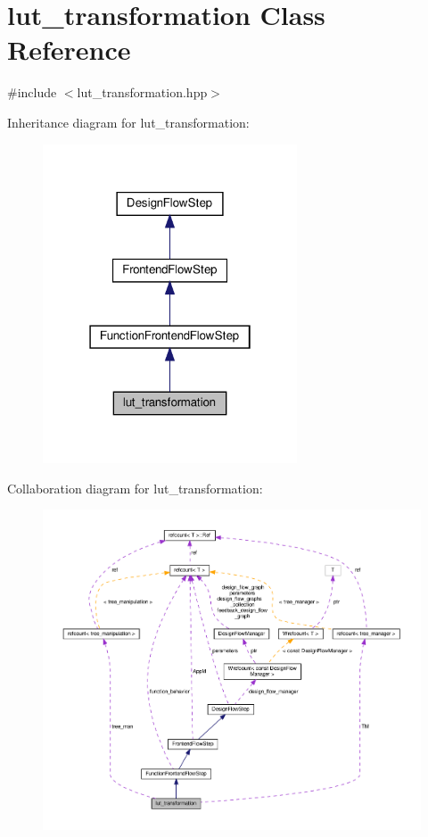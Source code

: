 \hypertarget{classlut__transformation}{}\section{lut\+\_\+transformation Class Reference}
\label{classlut__transformation}


{\ttfamily \#include $<$lut\+\_\+transformation.\+hpp$>$}



Inheritance diagram for lut\+\_\+transformation\+:
\nopagebreak
\begin{figure}[H]
\begin{center}
\leavevmode
\includegraphics[width=214pt]{de/d95/classlut__transformation__inherit__graph}
\end{center}
\end{figure}


Collaboration diagram for lut\+\_\+transformation\+:
\nopagebreak
\begin{figure}[H]
\begin{center}
\leavevmode
\includegraphics[width=350pt]{de/d1a/classlut__transformation__coll__graph}
\end{center}
\end{figure}
